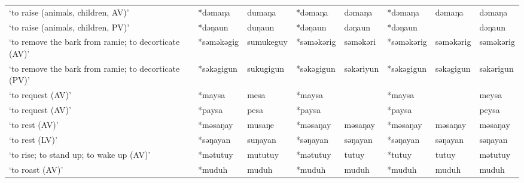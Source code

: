 \begin{landscape}
\begin{longtable}[c]{@{}p{3cm}<{\raggedright}p{2.75cm}<{\raggedright}p{2.75cm}<{\raggedright}p{2.75cm}<{\raggedright}p{2.75cm}<{\raggedright}p{2.75cm}<{\raggedright}p{2.75cm}<{\raggedright}p{2.75cm}<{\raggedright}@{}}
`to raise (animals, children, AV)'                   & *dəmaŋa      & dumaŋa                        & *dəmaŋa        & dəmaŋa                     & *dəmaŋa          & dəmaŋa                   & dəmaŋa                            \\
`to raise (animals, children, PV)'                   & *dəŋaun      & duŋaun                        & *dəŋaun        & dəŋaun                     & *dəŋaun          &                          & dəŋaun                            \\
`to remove the bark from ramie; to decorticate (AV)' & *səməkəgig   & sumukeguy                     & *səməkərig     & səməkəri                   & *səməkərig       & səməkərig                & səməkərig                         \\
`to remove the bark from ramie; to decorticate (PV)' & *səkəgigun   & sukugigun                     & *səkəgigun     & səkəriyun                  & *səkəgigun       & səkəgigun                & səkərigun                         \\
`to request (AV)'                                    & *maysa       & mesa                          & *maysa         &                            & *maysa           &                          & meysa                             \\
`to request (AV)'                                    & *paysa       & pesa                          & *paysa         &                            & *paysa           &                          & peysa                             \\
`to rest (AV)'                                       & *məsaŋay     & musaŋe                        & *məsaŋay       & məsaŋay                    & *məsaŋay         & məsaŋay                  & məsaŋay                           \\
`to rest (LV)'                                       & *səŋayan     & suŋayan                       & *səŋayan       & səŋayan                    & *səŋayan         & səŋayan                  & səŋayan                           \\
`to rise; to stand up; to wake up (AV)'              & *mətutuy     & mututuy                       & *mətutuy       & tutuy                      & *tutuy           & tutuy                    & mətutuy                           \\
`to roast (AV)'                                      & *muduh       & muduh                         & *muduh         & muduh                      & *muduh           & muduh                    & muduh                             \\

\end{longtable}
\end{landscape}
